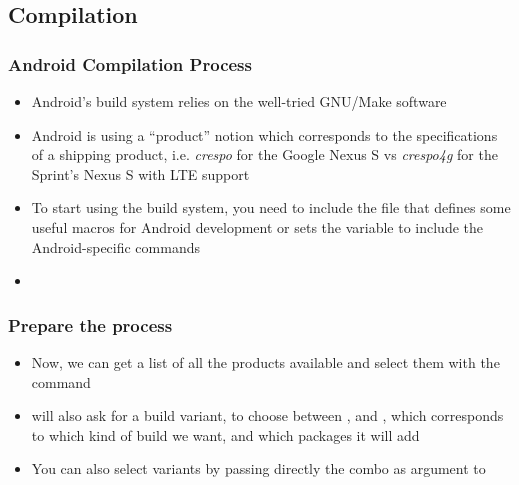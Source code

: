 \subsection{Compilation}
\begin{frame}
  \frametitle{Android Compilation Process}
  \begin{itemize}
  \item Android's build system relies on the well-tried GNU/Make
    software
  \item Android is using a ``product'' notion which corresponds to the
    specifications of a shipping product, i.e. \textit{crespo} for the
    Google Nexus S vs \textit{crespo4g} for the Sprint's Nexus S with
    LTE support
  \item To start using the build system, you need to include the file
     that defines some useful macros for
    Android development or sets the  variable to include the
    Android-specific commands
  \item {}
  \end{itemize}
\end{frame}

\begin{frame}
  \frametitle{Prepare the process}
  \begin{itemize}
  \item Now, we can get a list of all the products available and
    select them with the  command
  \item {} will also ask for a build variant, to choose
    between ,  and , which
    corresponds to which kind of build we want, and which packages it
    will add
  \item You can also select variants by passing directly the combo
     as argument to 
  \end{itemize}
\end{frame}

